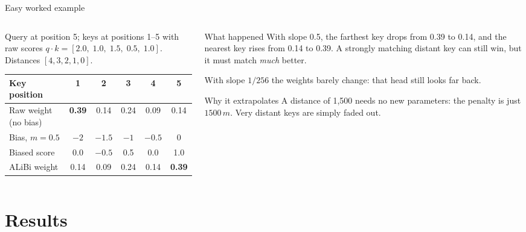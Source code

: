 \documentclass[aspectratio=169,11pt]{beamer}
\begin{document}
\begin{frame}{Easy worked example}
  \begin{columns}[T]
    \begin{column}{0.52\textwidth}
      \small
      Query at position 5; keys at positions 1--5 with raw scores $q\cdot k=[2.0,\;1.0,\;1.5,\;0.5,\;1.0]$. Distances $[4,3,2,1,0]$.
      \vspace{1mm}

      \footnotesize
      \begin{tabular}{@{}lccccc@{}}
        \toprule
        Key position & 1 & 2 & 3 & 4 & 5\\
        \midrule
        Raw weight (no bias) & \textbf{0.39} & 0.14 & 0.24 & 0.09 & 0.14\\
        Bias, $m=0.5$ & $-2$ & $-1.5$ & $-1$ & $-0.5$ & 0\\
        Biased score & 0.0 & $-0.5$ & 0.5 & 0.0 & 1.0\\
        ALiBi weight & 0.14 & 0.09 & 0.24 & 0.14 & \textbf{0.39}\\
        \bottomrule
      \end{tabular}
    \end{column}
    \begin{column}{0.44\textwidth}
      \begin{exampleblock}{What happened}
        \small
        With slope 0.5, the farthest key drops from 0.39 to 0.14, and the nearest key rises from 0.14 to 0.39.
        A strongly matching distant key can still win, but it must match \emph{much} better.
        \vspace{1mm}

        With slope $1/256$ the weights barely change: that head still looks far back.
      \end{exampleblock}
      \begin{block}{Why it extrapolates}
        \small
        A distance of 1,500 needs no new parameters: the penalty is just $1500\,m$. Very distant keys are simply faded out.
      \end{block}
    \end{column}
  \end{columns}
\end{frame}

\section{Results}
\end{document}
